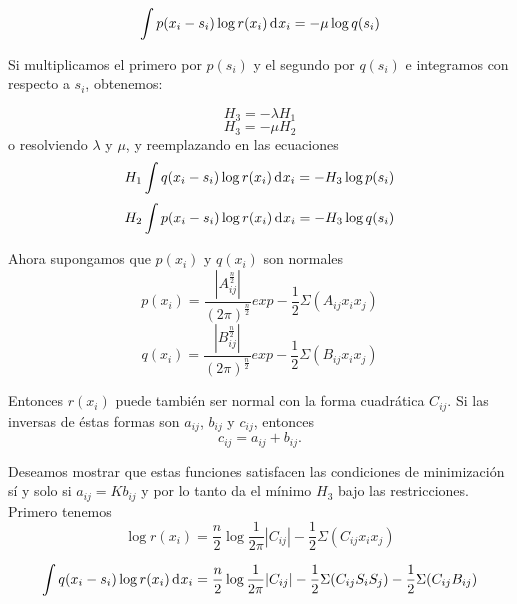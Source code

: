\begin{appendices}
\begin{equation} \int p(x_{i} - s_{i}) \log r(x_{i}) \diff x _{i} = -\mu \log q(s_{i}) \end{equation}
				
Si multiplicamos el primero por $p(s_{i})$ y el segundo por $q(s_{i})$ e integramos con 
respecto a $s_{i}$, obtenemos:

\begin{equation} H_{3} = -\lambda H_{1} \end{equation}
\begin{equation} H_{3} = -\mu H_{2} \end{equation}
o resolviendo $\lambda$ y $\mu$, y reemplazando en las ecuaciones
\begin{equation} H_{1} \int q(x_{i} - s_{i}) \log r(x_{i}) \diff x _{i} 
= - H_{3} \log p(s_{i}) 
\end{equation}
\begin{equation} H_{2} \int p(x_{i} - s_{i}) \log r(x_{i}) \diff x _{i} 
= - H_{3} \log q(s_{i}) \end{equation}

Ahora supongamos que $p(x_{i})$ y $q(x_{i})$ son normales
\begin{equation} p(x_{i}) = \frac{|A_{ij}^{\frac{n}{2}}|}{(2\pi)^{\frac{n}{2}}} exp - \frac{1}{2} \Sigma(A_{ij} x_{i} x_{j}) \end{equation}
\begin{equation} q(x_{i}) = \frac{|B_{ij}^{\frac{n}{2}}|}{(2\pi)^{\frac{n}{2}}} exp - \frac{1}{2} \Sigma(B_{ij} x_{i} x_{j}) \end{equation}

Entonces $r(x_{i})$ puede tambi\'en ser normal con la forma
cuadr\'atica $C_{ij}$. Si las inversas de \'estas formas son $a_{ij}$,
$b_{ij}$ y $c_{ij}$, entonces
\begin{equation} c_{ij} = a_{ij} + b_{ij}. \end{equation}
				
Deseamos mostrar que estas funciones satisfacen las condiciones de
minimizaci\'on s\'i y solo si $a_{ij} = Kb_{ij}$ y por lo tanto da el
m\'inimo $H_{3}$ bajo las restricciones. Primero tenemos
\begin{equation} \log r(x_{i}) = 
\frac{n}{2} \log \frac{1}{2\pi} |C_{ij}| - \frac{1}{2} 
\Sigma(C_{ij} x_{i} x_{j}) \end{equation}
			
\begin{equation} 
\int q(x_{i} - s_{i}) \log r(x_{i}) \diff x _{i} = \frac{n}{2} \log
\frac{1}{2\pi} |C_{ij}| - \frac{1}{2} \Sigma(C_{ij}S_{i}S_{j}) -
\frac{1}{2} \Sigma(C_{ij} B_{ij}) \end{equation}
		

\end{appendices}
